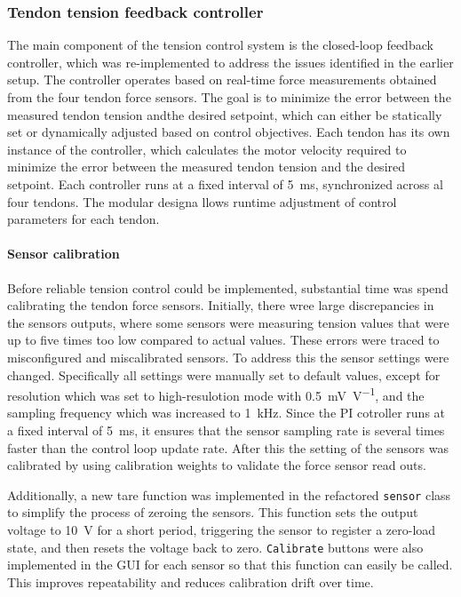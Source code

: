 \subsubsection{Tendon tension feedback controller}
The main component of the tension control system is the closed-loop feedback controller, which was re-implemented to address the issues identified in the earlier setup. The controller operates based on real-time force measurements obtained from the four tendon force sensors. The goal is to minimize the error between the measured tendon tension andthe desired setpoint, which can either be statically set or dynamically adjusted based on control objectives. 
\newline \newline
Each tendon has its own instance of the controller, which calculates the motor velocity required to minimize the error between the measured tendon tension and the desired setpoint. Each controller runs at a fixed interval of \SI{5}{\milli \second}, synchronized across al four tendons. The modular designa llows runtime adjustment of control parameters for each tendon.

\paragraph*{Sensor calibration}
Before reliable tension control could be implemented, substantial time was spend calibrating the tendon force sensors. Initially, there wree large discrepancies in the sensors outputs, where some sensors were measuring tension values that were up to five times too low compared to actual values. These errors were traced to misconfigured and miscalibrated sensors. To address this the sensor settings were changed. Specifically all settings were manually set to default values, except for resolution which was set to high-resulotion mode with  \SI{0.5}{\milli\volt\per\volt}, and the sampling frequency which was increased to \SI{1}{\kilo\hertz}. Since the PI cotroller runs at a fixed interval of \SI{5}{\milli\second}, it ensures that the sensor sampling rate is several times faster than the control loop update rate. After this the setting of the sensors was calibrated by using calibration weights to validate the force sensor read outs.

Additionally, a new tare function was implemented in the refactored \texttt{sensor} class to simplify the process of zeroing the sensors. This function sets the output voltage to \SI{10}{\volt} for a short period, triggering the sensor to register a zero-load state, and then resets the voltage back to zero. \texttt{Calibrate} buttons were also implemented in the GUI for each sensor so that this function can easily be called. This improves repeatability and reduces calibration drift over time.

